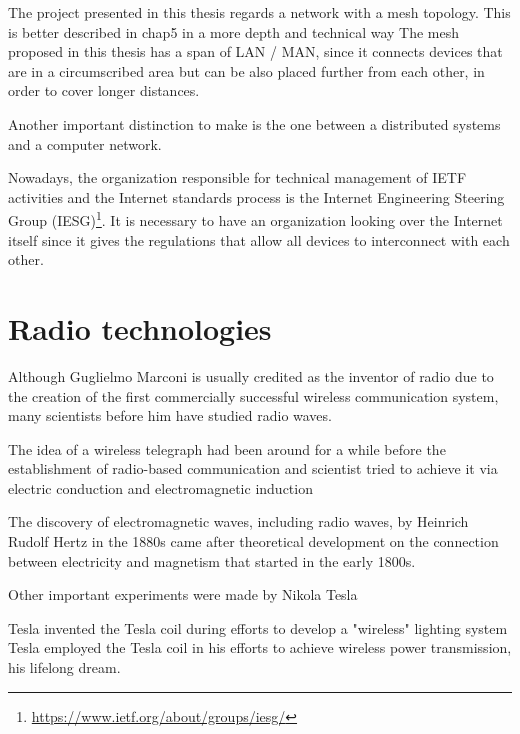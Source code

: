 	The project presented in this thesis regards a network with a mesh topology.
	This is better described in chap5 in a more depth and technical way
	The mesh proposed in this thesis has a span of LAN / MAN, since it connects devices that are in a circumscribed area but can be also placed further from each other, in order to cover longer distances.
	
	Another important distinction to make is the one between a distributed systems and a computer network.
	
	Nowadays, the organization responsible for technical management of IETF activities and the Internet standards process is the Internet Engineering Steering Group (IESG)\footnote{\url{https://www.ietf.org/about/groups/iesg/}}.
	It is necessary to have an organization looking over the Internet itself since it gives the regulations that allow all devices to interconnect with each other.
	
	\newpage	

\section{Radio technologies}\label{sec:radio_tech}
	
	Although Guglielmo Marconi is usually credited as the inventor of radio due to the creation of the first commercially successful wireless communication system, many scientists before him have studied radio waves.
	
	The idea of a wireless telegraph had been around for a while before the establishment of radio-based communication and scientist tried to achieve it via electric conduction and electromagnetic induction
	
	The discovery of electromagnetic waves, including radio waves, by Heinrich Rudolf Hertz in the 1880s came after theoretical development on the connection between electricity and magnetism that started in the early 1800s.
		
	
	
	Other important experiments were made by Nikola Tesla
	
	Tesla invented the Tesla coil during efforts to develop a "wireless" lighting system	
	Tesla employed the Tesla coil in his efforts to achieve wireless power transmission, his lifelong dream. 
	

